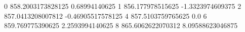 0 858.2003173828125 0.68994140625
1 856.177978515625 -1.3323974609375
2 857.0413208007812 -0.46905517578125
4 857.5103759765625 0.0
6 859.769775390625 2.2593994140625
8 865.6062622070312 8.09588623046875
